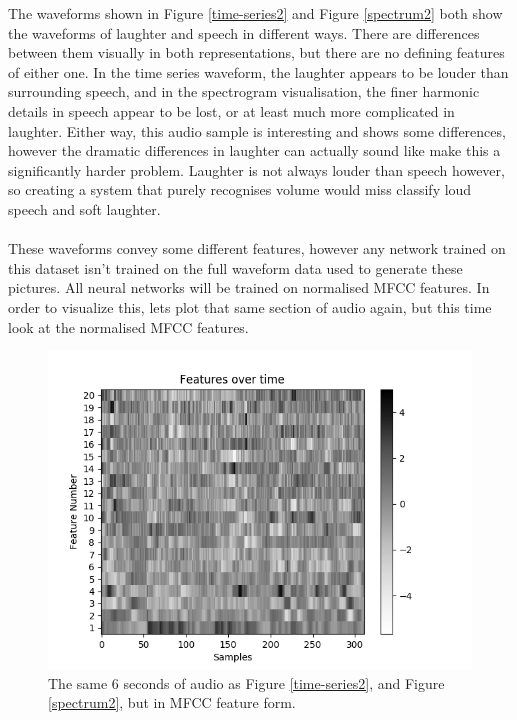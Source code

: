 \documentclass[a4paper,11pt,notitlepage]{article}
\begin{document}
The waveforms shown in Figure \ref{time-series2} and Figure \ref{spectrum2} both show the waveforms of laughter and speech in different ways. There are differences between them visually in both representations, but there are no defining features of either one. In the time series waveform, the laughter appears to be louder than surrounding speech, and in the spectrogram visualisation, the finer harmonic details in speech appear to be lost, or at least much more complicated in laughter. Either way, this audio sample is interesting and shows some differences, however the dramatic differences in laughter can actually sound like make this a significantly harder problem. Laughter is not always louder than speech however, so creating a system that purely recognises volume would miss classify loud speech and soft laughter.\\
\\
These waveforms convey some different features, however any network trained on this dataset isn't trained on the full waveform data used to generate these pictures. All neural networks will be trained on normalised MFCC features. In order to visualize this, lets plot that same section of audio again, but this time look at the normalised MFCC features.

\begin{figure}[H]
	\centering
	\vspace{0.5cm}
	\includegraphics[scale = 0.8]{figs/features_visualisation_grey.png}
	\caption{The same 6 seconds of audio as Figure \ref{time-series2}, and Figure \ref{spectrum2}, but in MFCC feature form.}
	\label{mfcc-visualisation}
\end{figure}
\end{document}
